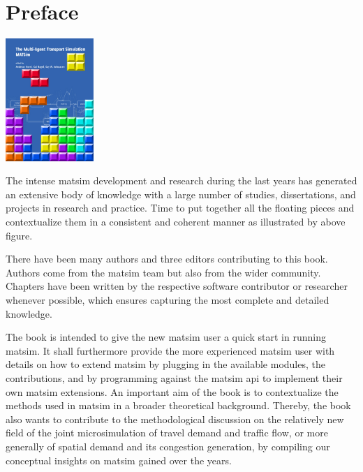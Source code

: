 \chapter*{Preface}

\begin{center} \includegraphics[width=0.25\textwidth, angle=0]{frontmatter/figures/MATSimBook} \end{center}

The intense \gls{matsim} development and research during the last years has generated an extensive body of knowledge with a large number of studies, dissertations, and projects in research and practice. Time to put together all the floating pieces and contextualize them in a consistent and coherent manner as illustrated by above figure. 

There have been many authors and three editors contributing to this book. Authors come from the \gls{matsim} team but also from the wider community. Chapters have been written by the respective software contributor or researcher whenever possible, which ensures capturing the most complete and detailed knowledge.

The book is intended to give the new \gls{matsim} user a quick start in running \gls{matsim}. It shall furthermore provide the more experienced \gls{matsim} user with details on how to extend \gls{matsim} by plugging in the available modules, \ie the \glspl{contribution}, and by programming against the \gls{matsim} \gls{api} to implement their own \gls{matsim} \glspl{extension}. An important aim of the book is to contextualize the methods used in \gls{matsim} in a broader theoretical background. Thereby, the book also wants to contribute to the methodological discussion on the relatively new field of the joint \gls{microsimulation} of travel demand and traffic flow, or more generally of spatial demand and its congestion generation, by compiling our conceptual insights on \gls{matsim} gained over the years.

